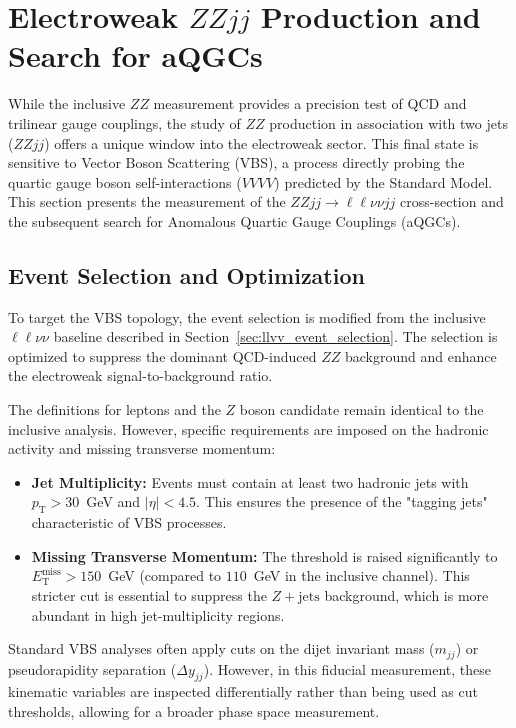 \section{Electroweak $ZZjj$ Production and Search for aQGCs}
\label{sec:llvvjj}

While the inclusive $ZZ$ measurement provides a precision test of QCD and trilinear gauge couplings, the study of $ZZ$ production in association with two jets ($ZZjj$) offers a unique window into the electroweak sector. This final state is sensitive to Vector Boson Scattering (VBS), a process directly probing the quartic gauge boson self-interactions ($VVVV$) predicted by the Standard Model. This section presents the measurement of the $ZZjj \to \ell\ell\nu\nu jj$ cross-section and the subsequent search for Anomalous Quartic Gauge Couplings (aQGCs).

\subsection{Event Selection and Optimization}
\label{subsec:zzjj_selection}

To target the VBS topology, the event selection is modified from the inclusive $\ell\ell\nu\nu$ baseline described in Section~\ref{sec:llvv_event_selection}. The selection is optimized to suppress the dominant QCD-induced $ZZ$ background and enhance the electroweak signal-to-background ratio.

The definitions for leptons and the $Z$ boson candidate remain identical to the inclusive analysis. However, specific requirements are imposed on the hadronic activity and missing transverse momentum:

\begin{itemize}
    \item \textbf{Jet Multiplicity:} Events must contain at least two hadronic jets with $p_{\mathrm{T}} > 30$~GeV and $|\eta| < 4.5$. This ensures the presence of the "tagging jets" characteristic of VBS processes.
    \item \textbf{Missing Transverse Momentum:} The threshold is raised significantly to $E_{\mathrm{T}}^{\text{miss}} > 150$~GeV (compared to $110$~GeV in the inclusive channel). This stricter cut is essential to suppress the $Z+\text{jets}$ background, which is more abundant in high jet-multiplicity regions.
\end{itemize}

Standard VBS analyses often apply cuts on the dijet invariant mass ($m_{jj}$) or pseudorapidity separation ($\Delta y_{jj}$). However, in this fiducial measurement, these kinematic variables are inspected differentially rather than being used as cut thresholds, allowing for a broader phase space measurement.


